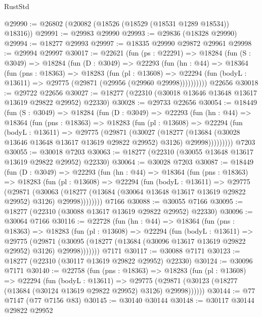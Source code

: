 \begin{lexlean}{RustStd}
\begin{coremodule}
@29990 := @26802 (@20082 (@18526 (@18529 (@18531 @1289 @18534)) @18316))
@29991 := @29983 @29990
@29993 := @29836 (@18328 @29990)
@29994 := @18277 @29993
@29997 := @18335 @29990 @29872 @29961
@29998 := @29994 @29997
@30017 := @22621
    (fun (ps : @22291) =>
    @18284
      (fun (S : @3049) =>
      @18284
        (fun (D : @3049) =>
        @22293
          (fun (hn : @44) =>
          @18364
            (fun (pns : @18363) =>
            @18283
              (fun (pl : @13608) =>
              @22294 (fun (bodyL : @13611) => @29775 (@29871 (@29956 (@29960 @29998))))))))))
    @22656
@30018 := @29722 @22656
@30027 := @18277 (@22310 (@30018 @13646 @13648 @13617 @13619 @29822 @29952) @22330)
@30028 := @29733 @22656
@30054 := @18449
    (fun (S : @3049) =>
    @18284
      (fun (D : @3049) =>
      @22293
        (fun (hn : @44) =>
        @18364
          (fun (pns : @18363) =>
          @18283
            (fun (pl : @13608) =>
            @22294
              (fun (bodyL : @13611) =>
              @29775
                (@29871
                  (@30027
                    (@18277
                      (@13684 (@30028 @13646 @13648 @13617 @13619 @29822 @29952) @3126)
                      @29998)))))))))
    @7203
@30055 := @30018 @7203
@30063 := @18277 (@22310 (@30055 @13648 @13617 @13619 @29822 @29952) @22330)
@30064 := @30028 @7203
@30087 := @18449
    (fun (D : @3049) =>
    @22293
      (fun (hn : @44) =>
      @18364
        (fun (pns : @18363) =>
        @18283
          (fun (pl : @13608) =>
          @22294
            (fun (bodyL : @13611) =>
            @29775
              (@29871
                (@30063
                  (@18277 (@13684 (@30064 @13648 @13617 @13619 @29822 @29952) @3126) @29998))))))))
    @7166
@30088 := @30055 @7166
@30095 := @18277 (@22310 (@30088 @13617 @13619 @29822 @29952) @22330)
@30096 := @30064 @7166
@30116 := @22728
    (fun (hn : @44) =>
    @18364
      (fun (pns : @18363) =>
      @18283
        (fun (pl : @13608) =>
        @22294
          (fun (bodyL : @13611) =>
          @29775
            (@29871
              (@30095 (@18277 (@13684 (@30096 @13617 @13619 @29822 @29952) @3126) @29998)))))))
    @7171
@30117 := @30088 @7171
@30123 := @18277 (@22310 (@30117 @13619 @29822 @29952) @22330)
@30124 := @30096 @7171
@30140 := @22758
    (fun (pns : @18363) =>
    @18283
      (fun (pl : @13608) =>
      @22294
        (fun (bodyL : @13611) =>
        @29775 (@29871 (@30123 (@18277 (@13684 (@30124 @13619 @29822 @29952) @3126) @29998))))))
@30144 := @77 @7147 (@77 @7156 @83)
@30145 := @30140 @30144
@30148 := @30117 @30144 @29822 @29952

\end{coremodule}
\end{lexlean}
